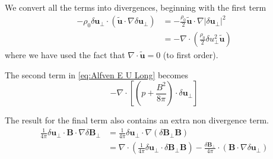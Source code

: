 We convert all the terms into divergences, beginning with the first term
\begin{equation*}
\begin{split}
    -\rho_{0} \delta \boldsymbol{u}_{\perp} \cdot (\tilde{\boldsymbol{u}}\cdot \nabla\delta \boldsymbol{u}_{\perp})
    &= -\frac{\rho_{0}}{2}  \tilde{\boldsymbol{u}}\cdot \nabla|\delta \boldsymbol{u}_{\perp}|^2\\
    &=- \nabla \cdot \left(\frac{\rho_{0}}{2}\delta u_{\perp}^2  \tilde{\boldsymbol{u}} \right)
\end{split}
\end{equation*}
where we have used the fact that \(\nabla\cdot \tilde{\boldsymbol{u}}=0\) (to first order).

The second term in \eqref{eq:Alfven E U Long} becomes 
\begin{equation*}
    -\nabla \cdot \left[\left( p +\frac{B^2}{8\pi}\right) \cdot \delta \boldsymbol{u}_{\perp}\right]
\end{equation*}

The result for the final term also contains an extra non divergence term.
\begin{equation*}
\begin{split}
    \frac{1}{4\pi}\delta \boldsymbol{u}_{\perp} \cdot \boldsymbol{B}\cdot \nabla \delta \boldsymbol{B}_{\perp}
    &=\frac{1}{4\pi}\delta \boldsymbol{u}_{\perp} \cdot \nabla (\delta \boldsymbol{B}_{\perp} \boldsymbol{B})\\
    &=\nabla \cdot \left(\frac{1}{4\pi}\delta \boldsymbol{u}_{\perp} \cdot\delta \boldsymbol{B}_{\perp} \boldsymbol{B} \right) - \frac{\delta \boldsymbol{B}_{\perp} }{4\pi} \cdot (\boldsymbol{B}\cdot \nabla \delta \boldsymbol{u}_{\perp})
\end{split}
\end{equation*}

